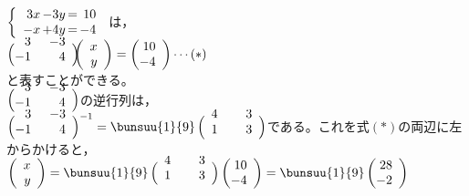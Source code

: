 \documentclass[a4paper,10pt,onecolumn,oneside,notitlepage,final]{jsarticle} %
\begin{document}
\begin{CKdata}
\quad
$\left\{\begin{array}{r@{\,}r@{\,=\,}r}
  3x& -3y&  10\\  -x& +4y&  -4
\end{array}\right.$
は，\\
\qquad
$\left(\begin{array}{@{}rr}
&\hspace{6mm}\\[-7mm]
   3&  -3\\  -1&   4
\end{array}\right)\hspace{-2mm}
\left(\begin{array}{r}   x\\  y \end{array}\right)
=\left(\begin{array}{@{}r} 10\\  -4\end{array}\right)\cdots(\ast)$
\\
と表すことができる。\\
\qquad
$\left(\begin{array}{@{}rr}
&\hspace{6mm}\\[-7mm]
   3&  -3\\  -1&   4
\end{array}\right)$の逆行列は，\\
\qquad
$\left(\begin{array}{@{}rr}
&\hspace{6mm}\\[-7mm]
   3&  -3\\  -1&   4
\end{array}\right)^{-1}
=\bunsuu{1}{9}
\left(\begin{array}{rr}
&\hspace{6mm}\\[-7mm]
   4&  3\\  1&   3
\end{array}\right)
$である。これを式$(\ast)$の両辺に左からかけると，\\
\qquad
$
\left(\begin{array}{r}   x\\  y \end{array}\right)
=\bunsuu{1}{9}\left(\begin{array}{rr} &\hspace{6mm}\\[-7mm]
   4&  3\\  1&   3 \end{array}\right)
   \left(\begin{array}{@{}r} 10\\  -4\end{array}\right)
=\bunsuu{1}{9}\left(\begin{array}{@{}r} 28\\  -2\end{array}\right)
$


\end{CKdata}
\end{document}
